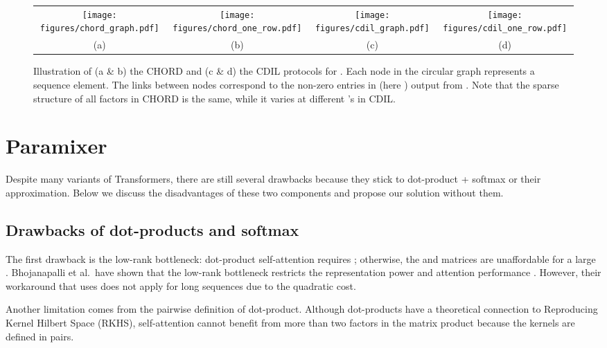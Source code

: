 \documentclass{article}
\begin{document}
\begin{figure*}[t]
\newcommand{\sqimgwidth}{4.0cm}
\newcommand{\parawidth}{4.8cm}
	\begin{center}
	\begin{tabular}{cccc}
		\texttt{[image: figures/chord\_graph.pdf]} &
		\texttt{[image: figures/chord\_one\_row.pdf]} &
		\texttt{[image: figures/cdil\_graph.pdf]} &
		\texttt{[image: figures/cdil\_one\_row.pdf]} \\
		(a) & (b) & (c) & (d)\\
	\end{tabular}
	\end{center}
	\caption{Illustration of (a \& b) the CHORD and (c \& d) the CDIL protocols for . Each node in the circular graph represents a sequence element. The links between nodes correspond to the non-zero entries in  (here ) output from . Note that the sparse structure of all factors in CHORD is the same, while it varies at different 's in CDIL.}
	\label{fig:paramixer_factor}
\end{figure*}


\section{Paramixer}

Despite many variants of Transformers, there are still several drawbacks because they stick to dot-product + softmax or their approximation. Below we discuss the disadvantages of these two components and propose our solution without them.

\subsection{Drawbacks of dot-products and softmax}
The first drawback is the low-rank bottleneck: dot-product self-attention requires ; otherwise, the  and  matrices are unaffordable for a large . Bhojanapalli et al.~have shown that the low-rank bottleneck restricts the representation power and attention performance \cite{mhabottleneck}. However, their workaround that uses  does not apply for long sequences due to the quadratic cost.

Another limitation comes from the pairwise definition of dot-product. Although dot-products have a theoretical connection to Reproducing Kernel Hilbert Space (RKHS), self-attention cannot benefit from more than two factors in the matrix product because the kernels are defined in pairs.
\end{document}
